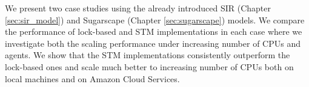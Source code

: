 We present two case studies using the already introduced SIR (Chapter \ref{sec:sir_model}) and Sugarscape (Chapter \ref{sec:sugarscape}) models. We compare the performance of lock-based and STM implementations in each case where we investigate both the scaling performance under increasing number of CPUs and agents. We show that the STM implementations consistently outperform the lock-based ones and scale much better to increasing number of CPUs both on local machines and on Amazon Cloud Services.



